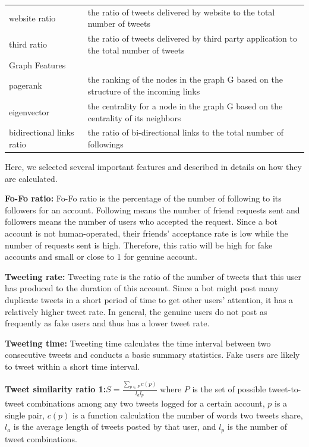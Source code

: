 \documentclass[a4paper, 12pt]{report}
\begin{document}
\begin{table}[H]
\begin{center}
\begin{tabular}{p{4.5cm} | p{11cm}}
			website ratio & the ratio of tweets delivered by website to the total number of tweets \\
			third ratio & the ratio of tweets delivered by third party application to the total number of tweets \\
			\hline
			\multicolumn{2}{|l|}{Graph Features} \\
			\hline
			pagerank & the ranking of the nodes in the graph G based on the structure of the incoming links\\
			eigenvector & the centrality for a node in the graph G based on the centrality of its neighbors \\
			bidirectional links ratio & the ratio of bi-directional links to the total number of followings \\
			\hline
		\end{tabular}
	\end{center}
\end{table}

\noindent Here, we selected several important features and described in details on how they are calculated. \par

\noindent\textbf{Fo-Fo ratio:} Fo-Fo ratio is the percentage of the number of following to its followers for an account. Following means the number of friend requests sent and followers means the number of users who accepted the request. Since a bot account is not human-operated, their friends' acceptance rate is low while the number of requests sent is high. Therefore, this ratio will be high for fake accounts and small or close to 1 for genuine account. 

\noindent\textbf{Tweeting rate:} Tweeting rate is the ratio of the number of tweets that this user has produced to the duration of this account. Since a bot might post many duplicate tweets in a short period of time to get other users' attention, it has a relatively higher tweet rate. In general, the genuine users do not post as frequently as fake users and thus has a lower tweet rate.

\noindent\textbf{Tweeting time:} Tweeting time calculates the time interval between two consecutive tweets and conducts a basic summary statistics. Fake users are likely to tweet within a short time interval.


\noindent\textbf{Tweet similarity ratio 1:}$S=\frac{\sum_{p\in P}c(p)}{l_al_p}$ where $P$ is the set of possible tweet-to-tweet combinations among any two tweets logged for a certain account, $p$ is a single pair, $c(p)$ is a function calculation the number of words two tweets share, $l_a$ is the average length of tweets posted by that user, and $l_p$ is the number of tweet combinations. \\
\end{document}

